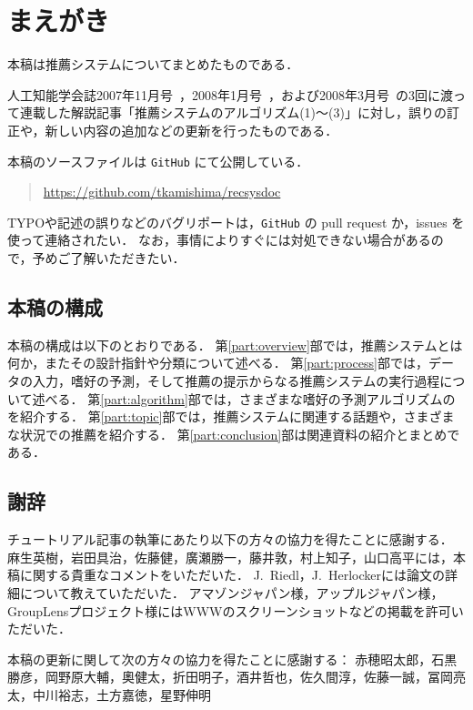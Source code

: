 \chapter*{まえがき}
\label{chap:preface}

本稿は推薦システムについてまとめたものである．

人工知能学会誌2007年11月号~\cite{jpublist:076}，2008年1月号~\cite{jpublist:081}，および2008年3月号~\cite{jpublist:083}の3回に渡って連載した解説記事「推薦システムのアルゴリズム(1)〜(3)」に対し，誤りの訂正や，新しい内容の追加などの更新を行ったものである．

本稿のソースファイルは \texttt{GitHub} にて公開している．
\begin{quote}
\url{https://github.com/tkamishima/recsysdoc}
\end{quote}
TYPOや記述の誤りなどのバグリポートは，\texttt{GitHub} の pull request か，issues を使って連絡されたい．
なお，事情によりすぐには対処できない場合があるので，予めご了解いただきたい．

\section*{本稿の構成}
\label{sec:preface:organization}

本稿の構成は以下のとおりである．
第\ref{part:overview}部では，推薦システムとは何か，またその設計指針や分類について述べる．
第\ref{part:process}部では，データの入力，嗜好の予測，そして推薦の提示からなる推薦システムの実行過程について述べる．
第\ref{part:algorithm}部では，さまざまな嗜好の予測アルゴリズムのを紹介する．
第\ref{part:topic}部では，推薦システムに関連する話題や，さまざまな状況での推薦を紹介する．
第\ref{part:conclusion}部は関連資料の紹介とまとめである．

\section*{謝辞}
\label{sec:preface:ack}

チュートリアル記事の執筆にあたり以下の方々の協力を得たことに感謝する．
麻生英樹，岩田具治，佐藤健，廣瀬勝一，藤井敦，村上知子，山口高平には，本稿に関する貴重なコメントをいただいた．
J.~Riedl，J.~Herlockerには論文の詳細について教えていただいた．
アマゾンジャパン様，アップルジャパン様，GroupLensプロジェクト様にはWWWのスクリーンショットなどの掲載を許可いただいた．

本稿の更新に関して次の方々の協力を得たことに感謝する：
赤穂昭太郎，石黒勝彦，岡野原大輔，奧健太，折田明子，酒井哲也，佐久間淳，佐藤一誠，冨岡亮太，中川裕志，土方嘉徳，星野伸明
